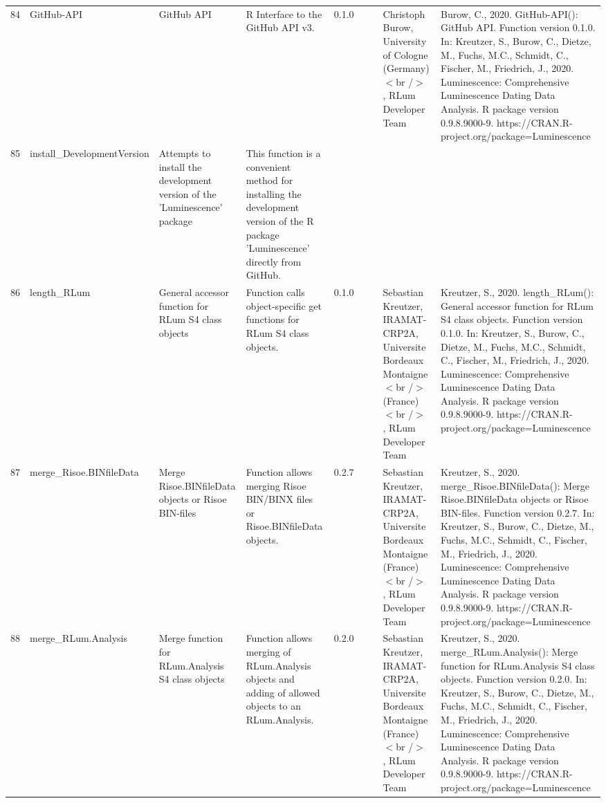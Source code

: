 \begin{table}[ht]
\begin{tabular}{rllllllll}
 \\ 
  84 & GitHub-API & GitHub API & R Interface to the GitHub API v3. & 0.1.0
 &  &  & Christoph Burow, University of Cologne (Germany)$<$br /$>$ , RLum Developer Team & Burow, C., 2020. GitHub-API(): GitHub API. Function version 0.1.0. In: Kreutzer, S., Burow, C., Dietze, M., Fuchs, M.C., Schmidt, C., Fischer, M., Friedrich, J., 2020. Luminescence: Comprehensive Luminescence Dating Data Analysis. R package version 0.9.8.9000-9. https://CRAN.R-project.org/package=Luminescence
 \\ 
  85 & install\_DevelopmentVersion & Attempts to install the development version of the 'Luminescence' package & This function is a convenient method for installing the development version of the R package 'Luminescence' directly from GitHub. &  &  &  &  &  \\ 
  86 & length\_RLum & General accessor function for RLum S4 class objects & Function calls object-specific get functions for RLum S4 class objects. & 0.1.0
 &  &  & Sebastian Kreutzer, IRAMAT-CRP2A, Universite Bordeaux Montaigne$<$br /$>$ (France)$<$br /$>$ , RLum Developer Team & Kreutzer, S., 2020. length\_RLum(): General accessor function for RLum S4 class objects. Function version 0.1.0. In: Kreutzer, S., Burow, C., Dietze, M., Fuchs, M.C., Schmidt, C., Fischer, M., Friedrich, J., 2020. Luminescence: Comprehensive Luminescence Dating Data Analysis. R package version 0.9.8.9000-9. https://CRAN.R-project.org/package=Luminescence
 \\ 
  87 & merge\_Risoe.BINfileData & Merge Risoe.BINfileData objects or Risoe BIN-files & Function allows merging Risoe BIN/BINX files or Risoe.BINfileData objects. & 0.2.7
 &  &  & Sebastian Kreutzer, IRAMAT-CRP2A, Universite Bordeaux Montaigne (France)$<$br /$>$ , RLum Developer Team & Kreutzer, S., 2020. merge\_Risoe.BINfileData(): Merge Risoe.BINfileData objects or Risoe BIN-files. Function version 0.2.7. In: Kreutzer, S., Burow, C., Dietze, M., Fuchs, M.C., Schmidt, C., Fischer, M., Friedrich, J., 2020. Luminescence: Comprehensive Luminescence Dating Data Analysis. R package version 0.9.8.9000-9. https://CRAN.R-project.org/package=Luminescence
 \\ 
  88 & merge\_RLum.Analysis & Merge function for RLum.Analysis S4 class objects & Function allows merging of RLum.Analysis objects and adding of allowed objects to an RLum.Analysis. & 0.2.0
 &  &  & Sebastian Kreutzer, IRAMAT-CRP2A, Universite Bordeaux Montaigne (France)$<$br /$>$ , RLum Developer Team & Kreutzer, S., 2020. merge\_RLum.Analysis(): Merge function for RLum.Analysis S4 class objects. Function version 0.2.0. In: Kreutzer, S., Burow, C., Dietze, M., Fuchs, M.C., Schmidt, C., Fischer, M., Friedrich, J., 2020. Luminescence: Comprehensive Luminescence Dating Data Analysis. R package version 0.9.8.9000-9. https://CRAN.R-project.org/package=Luminescence

\end{tabular}
\end{table}
